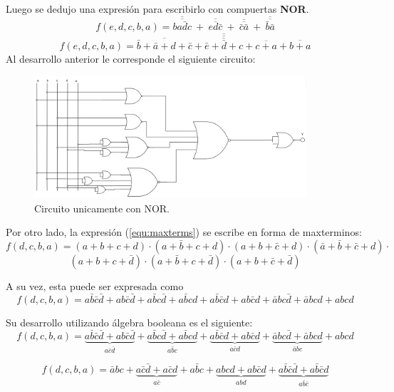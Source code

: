 \documentclass[a4paper]{article}
\begin{document}
\begin{center}
Luego se dedujo una expresión para escribirlo con compuertas \textbf{NOR}.
\[
	f \left( e,d,c,b,a \right) = \overline{\overline{b a \bar{d} c }} \ + \  \overline{\overline{ e d \bar{c}}} \ + \ \overline{\overline{\bar{c} \bar{a}}} \ + \ \overline{\overline{ \bar{b} \bar{a}}}
\]
\[
	f \left( e,d,c,b,a \right) =\overline{\overline{\overline{\bar{b}+\bar{a}+d+\bar{c}}+\overline{\bar{e}+\bar{d}+c}+\overline{c+a}+\overline{b+a}}}
\]
Al desarrollo anterior le corresponde el siguiente circuito:
\begin{figure}[H]
	\centering
	\includegraphics[width=0.9\textwidth]{Circuito4.PNG}
	\caption{Circuito unicamente con NOR.}
	\label{fig:circ4}
\end{figure}

Por otro lado, la expresión (\ref{equ:maxterms}) se escribe en forma de maxterminos:
\[
	f \left( d,c,b,a \right) = \left( a + b + c + d \right) \cdot \left( a + \bar{b} + c + d\right) \cdot \left( a + b+ \bar{c} + d \right) \cdot \left( \bar{a} + \bar{b} + \bar{c} + d \right) \cdot
\]
\[
	\left( a + b + c + \bar{d} \right) \cdot \left( a + \bar{b} + c + \bar{d} \right) \cdot \left( a + b + \bar{c} +\bar{d} \right)
\]

A su vez, esta puede ser expresada como
\[
	f \left( d,c,b,a \right) = a\bar{b}\bar{c}\bar{d} + ab\bar{c}\bar{d} +
	a\bar{b}c\bar{d} + a\bar{b}cd + a\bar{b}\bar{c}d + ab\bar{c}d + \bar{a}bc\bar{d} + \bar{a}bcd + abcd
\]

Su desarrollo utilizando álgebra booleana es el siguiente:
\[
	f \left( d,c,b,a \right) = \underbrace{a\bar{b}\bar{c}\bar{d} + ab\bar{c}\bar{d}}_{a\bar{c}\bar{d}} +
	\underbrace{a\bar{b}c\bar{d} + a\bar{b}cd}_{a\bar{b}c} + \underbrace{a\bar{b}\bar{c}d + ab\bar{c}d}_{a\bar{c}d} + \underbrace{\bar{a}bc\bar{d} + \bar{a}bcd}_{\bar{a}bc} + abcd
\]

\[
	f \left( d,c,b,a \right) = \bar{a}bc + \underbrace{a\bar{c}\bar{d} + a\bar{c}d}_{a\bar{c}} + a\bar{b}c + \underbrace{abcd + ab\bar{c}d}_{abd} + \underbrace{a\bar{b}\bar{c}\bar{d} + a\bar{b}\bar{c}d}_{a\bar{b}\bar{c}} 
\]


\end{center}
\end{document}

